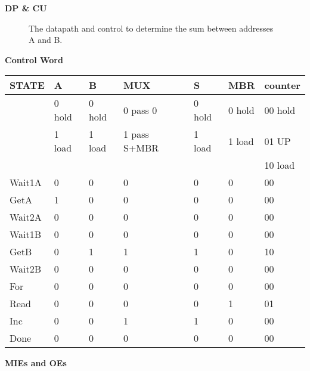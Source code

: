 \begin{enumerate}
\begin{onlysolution}
{\textbf{ DP \& CU}

\begin{figure}[ht]
\caption{The datapath and control to determine the sum between
addresses A and B.}
\end{figure}


\textbf{ Control Word}

\begin{tabular}{l|l|l|l|l|l|l}
STATE & A      & B      &MUX          &S      &MBR    &counter	\\ \hline
      & 0 hold & 0 hold &0 pass 0     &0 hold &0 hold &00 hold	\\ \hline
      & 1 load & 1 load &1 pass S+MBR &1 load &1 load &01 UP	\\ \hline
      &        &        &             &       &       &10 load	\\ \hline
Wait1A& 0      & 0      &0            &0      &0      &00	\\ \hline
GetA  & 1      & 0      &0            &0      &0      &00	\\ \hline
Wait2A& 0      & 0      &0            &0      &0      &00	\\ \hline
Wait1B& 0      & 0      &0            &0      &0      &00	\\ \hline
GetB  & 0      & 1      &1            &1      &0      &10	\\ \hline
Wait2B& 0      & 0      &0            &0      &0      &00	\\ \hline
For   & 0      & 0      &0            &0      &0      &00	\\ \hline
Read  & 0      & 0      &0            &0      &1      &01	\\ \hline
Inc   & 0      & 0      &1            &1      &0      &00	\\ \hline
Done  & 0      & 0      &0            &0      &0      &00	\\ 
\end{tabular}

\textbf{ MIEs and OEs}

}
\end{onlysolution}
\end{enumerate}
